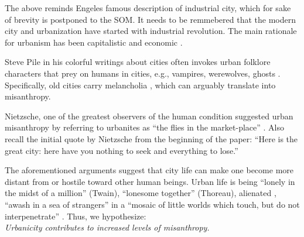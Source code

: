 \documentclass[11pt, letterpaper]{article}
\begin{document}
\begin{spacing}{1.4}
The above reminds Engeles famous description of industrial city, which for sake
of brevity is postponed to the SOM. It needs to be remmebered that the modern city and
urbanization have started with industrial revolution. The main rationale for
urbanism has been capitalistic and economic \citep{osullivan09,glaeser11}.

Steve Pile in his colorful writings about cities often invokes
urban folklore characters that prey on humans in cities, e.g., vampires, werewolves, ghosts  \citep{pile05,pile05B,pile99}.
%
Specifically, old cities carry melancholia \citep{pile05B}, which can arguably translate into misanthropy.
%

Nietzsche, one of the greatest observers of the human condition suggested urban
misanthropy by referring %
 to urbanites as ``the flies in the market-place'' \citep{nietzsche05}. Also
 recall the initial quote by Nietzsche from the beginning of the paper: ``Here
 is the great city: here have you nothing to seek and everything to lose.''

The aforementioned arguments suggest that city life can make one become more
distant from or hostile toward other human beings. %
Urban life is being ``lonely in the midst of a million'' (Twain), ``lonesome together''
(Thoreau), alienated \citep{wirth38,nettler1957measure}, ``awash in a sea of strangers''
\citep[Merry cited in][p. 99]{wilson85} in a ``mosaic of little worlds which touch, but do not interpenetrate'' \citep[][p. 40]{park84}. Thus, we hypothesize: \\
 
{\indent\hspace{1in}\textit{Urbanicity contributes to increased levels of misanthropy.\\}}
     


\end{spacing}
\end{document}
